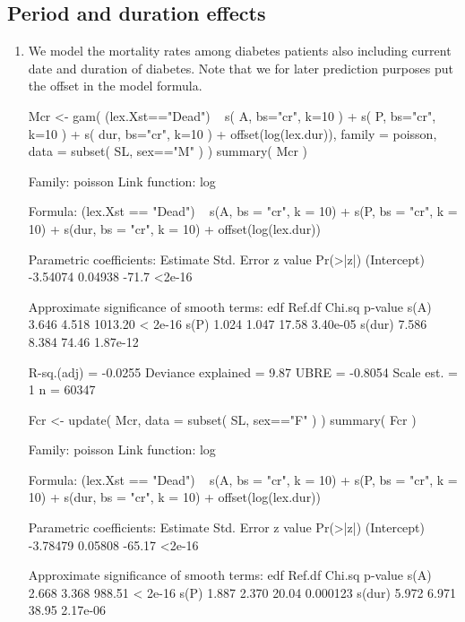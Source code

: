 \subsection*{Period and duration effects}

\begin{enumerate}[resume]

  
\item We model the mortality rates among diabetes patients also
  including current date and duration of diabetes. Note that we for
  later prediction purposes put the offset in the model formula.
\begin{Schunk}
\begin{Sinput}
 Mcr <- gam( (lex.Xst=="Dead") ~ s(   A, bs="cr", k=10 ) +
                                 s(   P, bs="cr", k=10 ) +
                                 s( dur, bs="cr", k=10 ) + offset(log(lex.dur)),
             family = poisson,
               data = subset( SL, sex=="M" ) )
 summary( Mcr )
\end{Sinput}
\begin{Soutput}
Family: poisson 
Link function: log 

Formula:
(lex.Xst == "Dead") ~ s(A, bs = "cr", k = 10) + s(P, bs = "cr", 
    k = 10) + s(dur, bs = "cr", k = 10) + offset(log(lex.dur))

Parametric coefficients:
            Estimate Std. Error z value Pr(>|z|)
(Intercept) -3.54074    0.04938   -71.7   <2e-16

Approximate significance of smooth terms:
         edf Ref.df  Chi.sq  p-value
s(A)   3.646  4.518 1013.20  < 2e-16
s(P)   1.024  1.047   17.58 3.40e-05
s(dur) 7.586  8.384   74.46 1.87e-12

R-sq.(adj) =  -0.0255   Deviance explained = 9.87%
UBRE = -0.8054  Scale est. = 1         n = 60347
\end{Soutput}
\begin{Sinput}
 Fcr <- update( Mcr, data = subset( SL, sex=="F" ) )
 summary( Fcr )
\end{Sinput}
\begin{Soutput}
Family: poisson 
Link function: log 

Formula:
(lex.Xst == "Dead") ~ s(A, bs = "cr", k = 10) + s(P, bs = "cr", 
    k = 10) + s(dur, bs = "cr", k = 10) + offset(log(lex.dur))

Parametric coefficients:
            Estimate Std. Error z value Pr(>|z|)
(Intercept) -3.78479    0.05808  -65.17   <2e-16

Approximate significance of smooth terms:
         edf Ref.df Chi.sq  p-value
s(A)   2.668  3.368 988.51  < 2e-16
s(P)   1.887  2.370  20.04 0.000123
s(dur) 5.972  6.971  38.95 2.17e-06


\end{Soutput}
\end{Schunk}
\end{enumerate}
